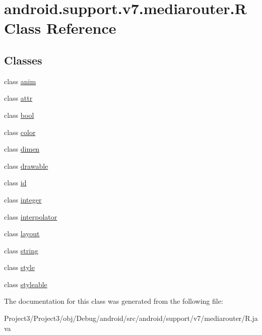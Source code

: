 \hypertarget{classandroid_1_1support_1_1v7_1_1mediarouter_1_1R}{}\section{android.\+support.\+v7.\+mediarouter.\+R Class Reference}
\label{classandroid_1_1support_1_1v7_1_1mediarouter_1_1R}
\subsection*{Classes}
\begin{DoxyCompactItemize}
\item 
class \hyperlink{classandroid_1_1support_1_1v7_1_1mediarouter_1_1R_1_1anim}{anim}
\item 
class \hyperlink{classandroid_1_1support_1_1v7_1_1mediarouter_1_1R_1_1attr}{attr}
\item 
class \hyperlink{classandroid_1_1support_1_1v7_1_1mediarouter_1_1R_1_1bool}{bool}
\item 
class \hyperlink{classandroid_1_1support_1_1v7_1_1mediarouter_1_1R_1_1color}{color}
\item 
class \hyperlink{classandroid_1_1support_1_1v7_1_1mediarouter_1_1R_1_1dimen}{dimen}
\item 
class \hyperlink{classandroid_1_1support_1_1v7_1_1mediarouter_1_1R_1_1drawable}{drawable}
\item 
class \hyperlink{classandroid_1_1support_1_1v7_1_1mediarouter_1_1R_1_1id}{id}
\item 
class \hyperlink{classandroid_1_1support_1_1v7_1_1mediarouter_1_1R_1_1integer}{integer}
\item 
class \hyperlink{classandroid_1_1support_1_1v7_1_1mediarouter_1_1R_1_1interpolator}{interpolator}
\item 
class \hyperlink{classandroid_1_1support_1_1v7_1_1mediarouter_1_1R_1_1layout}{layout}
\item 
class \hyperlink{classandroid_1_1support_1_1v7_1_1mediarouter_1_1R_1_1string}{string}
\item 
class \hyperlink{classandroid_1_1support_1_1v7_1_1mediarouter_1_1R_1_1style}{style}
\item 
class \hyperlink{classandroid_1_1support_1_1v7_1_1mediarouter_1_1R_1_1styleable}{styleable}
\end{DoxyCompactItemize}


The documentation for this class was generated from the following file\+:\begin{DoxyCompactItemize}
\item 
Project3/\+Project3/obj/\+Debug/android/src/android/support/v7/mediarouter/R.\+java\end{DoxyCompactItemize}
